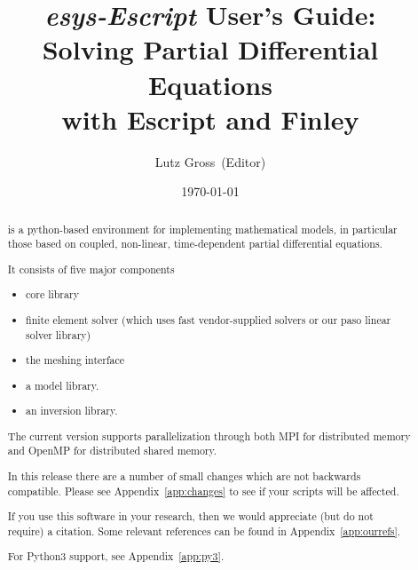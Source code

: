 \documentclass{esysdoc}
\title{\emph{esys-Escript} User's Guide:\\ Solving Partial Differential Equations\\ with Escript and Finley}
\author{Lutz Gross\etal~(Editor)}
\date{\today}
\begin{document}
\maketitle

\ifpdf
{}
\fi




\begin{abstract}%
\escript is a python-based environment for implementing mathematical models, in particular those based on coupled, non-linear, time-dependent partial differential equations.



It consists of five major components
\begin{itemize}
\item \escript core library
\item finite element solver \finley (which uses fast vendor-supplied solvers or our paso linear solver library)
\item the meshing interface \pycad
\item a model library.
\item an inversion library.
\end{itemize}
The current version supports parallelization through both MPI for distributed memory and OpenMP for distributed shared memory.

In this release there are a number of small changes which are not backwards compatible.
Please see Appendix~\ref{app:changes} to see if your scripts will be affected.


If you use this software in your research, then we would appreciate (but do not require) a citation.
Some relevant references can be found in Appendix~\ref{app:ourrefs}.

For Python3 support, see Appendix~\ref{app:py3}.
\end{abstract}

\cleardoublepage{}%
\tableofcontents









\esysappendix %

%


\cleardoublepage
{}
{}
\printindex

\cleardoublepage
{}
{}


\end{document}
